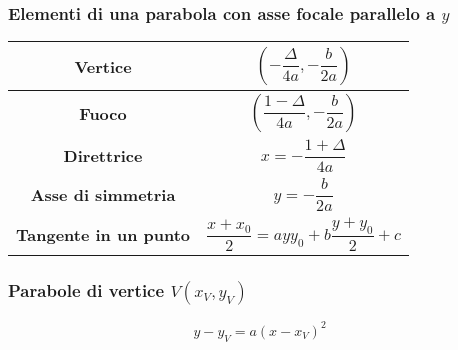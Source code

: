 \subsubsection{Elementi di una parabola con asse focale parallelo a $y$}
\begin{center}
  \begin{tabular}{c | c}
    \textbf{Vertice} & $\left(-\dfrac{\Delta}{4a},-\dfrac{b}{2a}\right)$\\\hline
    \textbf{Fuoco} & $\left(\dfrac{1-\Delta}{4a},-\dfrac{b}{2a}\right)$\\\hline
    \textbf{Direttrice} & $x=-\dfrac{1+\Delta}{4a}$\\\hline
    \textbf{Asse di simmetria} & $y=-\dfrac{b}{2a}$\\\hline
    \textbf{Tangente in un punto} & $\dfrac{x+x_0}{2}=ayy_0+b\dfrac{y+y	_0}{2}+c$
  \end{tabular}
\end{center}

\subsubsection{Parabole di vertice $V(x_V,y_V)$}
\begin{equation*}
  y-y_V=a(x-x_V)^2
\end{equation*}

